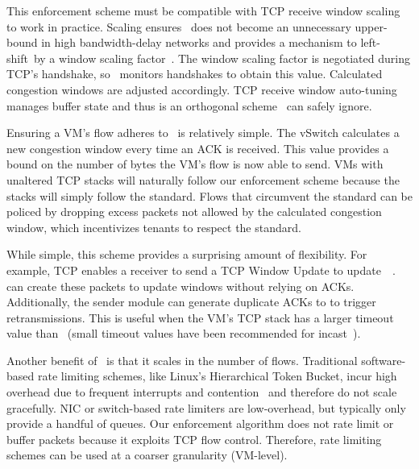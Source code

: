 This enforcement scheme must be compatible with TCP receive window scaling to work in practice.
Scaling ensures~\rwnd{} does not become an unnecessary upper-bound in high bandwidth-delay networks
and provides a mechanism to left-shift~\rwnd by a window scaling factor~\cite{RFC1323}. 
The window scaling factor is negotiated during TCP's handshake, so~\acdc{} monitors handshakes
to obtain this value. Calculated congestion windows are adjusted accordingly.
TCP receive window auto-tuning~\cite{semke1998automatic} manages buffer state
and thus is an orthogonal scheme~\acdc{} can safely ignore.

Ensuring a VM's flow adheres to~\rwnd{} is relatively simple. The vSwitch calculates a new congestion 
window every time an ACK is received. This value provides a bound on the number of bytes the VM's flow
is now able to send. VMs with unaltered TCP stacks will naturally follow our enforcement scheme because the stacks
will simply follow the standard. Flows that circumvent the standard can be policed by dropping
excess packets not allowed by the calculated congestion window, which incentivizes tenants to respect the standard.

While simple, this scheme provides a surprising amount of flexibility. For example, TCP enables
a receiver to send a TCP Window Update to update~\rwnd{}~\cite{RFC5681}.~\acdc{}
can create these packets to update windows without relying on ACKs.
Additionally, the sender module can generate duplicate ACKs to to trigger retransmissions. This is useful when 
the VM's TCP stack has a larger timeout value than~\acdc{} (\eg{}small timeout values
have been recommended for incast~\cite{vasudevan2009safe}). 

Another benefit of~\acdc{} is that it scales in the number of flows.
Traditional software-based rate limiting schemes, like Linux's Hierarchical Token Bucket, 
incur high overhead due to frequent interrupts and contention~\cite{radhakrishnan2014senic} and
therefore do not scale gracefully. NIC or switch-based rate limiters are low-overhead, but typically
only provide a handful of queues. Our enforcement algorithm does not rate limit or buffer packets because it exploits TCP
flow control. Therefore, rate limiting schemes can be used at a coarser granularity (\eg{}VM-level).


